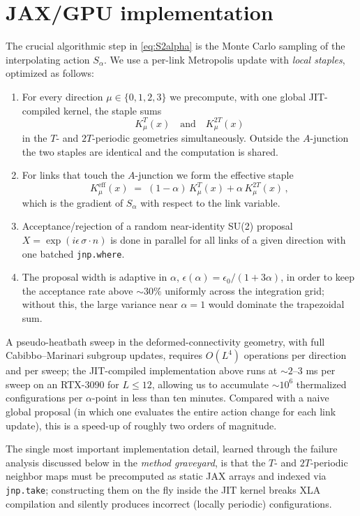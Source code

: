 \documentclass[aps,prl,reprint,superscriptaddress,floatfix,nofootinbib,amssymb]{revtex4-2}
\begin{document}
\section{JAX/GPU implementation}
\label{sec:gpu}

The crucial algorithmic step in \eqref{eq:S2alpha} is the Monte Carlo sampling of the interpolating action $S_\alpha$. We use a per-link Metropolis update with \emph{local staples}, optimized as follows:

\begin{enumerate}
\item For every direction $\mu\in\{0,1,2,3\}$ we precompute, with one global JIT-compiled kernel, the staple sums
\[ K^T_\mu(x) \quad\text{and}\quad K^{2T}_\mu(x) \]
in the $T$- and $2T$-periodic geometries simultaneously. Outside the $A$-junction the two staples are identical and the computation is shared.
\item For links that touch the $A$-junction we form the effective staple
\[ K^{\mathrm{eff}}_\mu(x) \;=\; (1-\alpha)\,K^T_\mu(x) + \alpha\,K^{2T}_\mu(x)\,, \]
which is the gradient of $S_\alpha$ with respect to the link variable.
\item Acceptance/rejection of a random near-identity SU(2) proposal $X = \exp(i\epsilon\,\sigma\!\cdot\!n)$ is done in parallel for all links of a given direction with one batched \texttt{jnp.where}.
\item The proposal width is adaptive in $\alpha$, $\epsilon(\alpha) = \epsilon_0/(1+3\alpha)$, in order to keep the acceptance rate above $\sim\!30\%$ uniformly across the integration grid; without this, the large variance near $\alpha=1$ would dominate the trapezoidal sum.
\end{enumerate}

A pseudo-heatbath sweep in the deformed-connectivity geometry, with full Cabibbo--Marinari subgroup updates, requires $O(L^4)$ operations per direction and per sweep; the JIT-compiled implementation above runs at $\sim\!2\text{--}3$ ms per sweep on an RTX-3090 for $L\le 12$, allowing us to accumulate $\sim\!10^6$ thermalized configurations per $\alpha$-point in less than ten minutes. Compared with a naive global proposal (in which one evaluates the entire action change for each link update), this is a speed-up of roughly two orders of magnitude.

The single most important implementation detail, learned through the failure analysis discussed below in the \emph{method graveyard}, is that the $T$- and $2T$-periodic neighbor maps must be precomputed as static JAX arrays and indexed via \texttt{jnp.take}; constructing them on the fly inside the JIT kernel breaks XLA compilation and silently produces incorrect (locally periodic) configurations.
\end{document}
